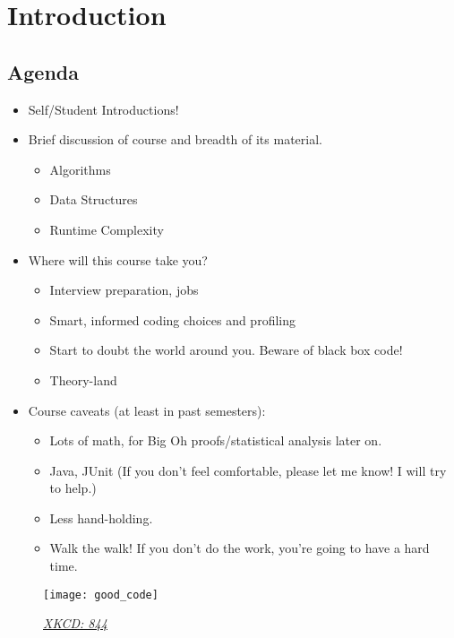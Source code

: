 

\section*{Introduction}
\subsection*{Agenda}
\begin{itemize}
    \item Self/Student Introductions!
    \item Brief discussion of course and breadth of its material.
        \begin{itemize}
            \item Algorithms
            \item Data Structures
            \item Runtime Complexity
        \end{itemize}
    \item Where will this course take you?
        \begin{itemize}
            \item Interview preparation, jobs
            \item Smart, informed coding choices and profiling
            \item Start to doubt the world around you. Beware of black box code!
            \item Theory-land
        \end{itemize}
    \item Course caveats (at least in past semesters):
        \begin{itemize}
            \item Lots of math, for Big Oh proofs/statistical analysis later on.
            \item Java, JUnit (If you don't feel comfortable, please let me know! I will try to help.)
            \item Less hand-holding.
            \item Walk the walk! If you don't do the work, you're going to have a hard time.
        \end{itemize}
\end{itemize}
\begin{figure}[h]
    \centering
    \texttt{[image: good\_code]}
    \caption*{\underline{\textit{\href{http://xkcd.com/844}{XKCD: 844}}}}
\end{figure}

